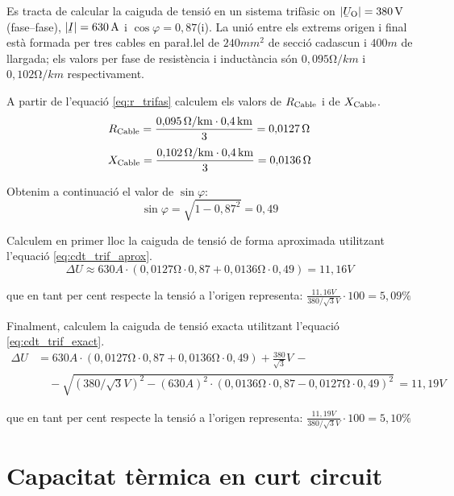 \vspace{2mm}
\begin{exemple}
   Es tracta de calcular la caiguda de tensi\'{o} en un sistema trif\`{a}sic on $|\cmplx{U}\ped{O}| = 380\unit{V}$ (fase--fase), $|\cmplx{I}|=630\unit{A}$ i $\cos \varphi = 0{,}87$(i). La uni\'{o} entre els extrems origen  i final est\`{a} formada per tres cables en para{\l.l}el de $240\unit{mm^2}$ de secci\'{o} cadascun i $400\unit{m}$ de llargada; els valors per fase de resist\`{e}ncia i induct\`{a}ncia s\'{o}n $0{,}095\unit{\ohm/km}$ i $0{,}102\unit{\ohm/km}$ respectivament.

A partir de l'equaci\'{o} \eqref{eq:r_trifas} calculem els valors de $R_\mathrm{Cable}$ i de $X_\mathrm{Cable}$.
\[
   R_\mathrm{Cable} = \frac{0{,}095\mathrm{\,\mathrm{\Omega}/km}\cdot 0{,}4\mathrm{\,km}}{3} = 0{,}0127\mathrm{\,\mathrm{\Omega}}
\]
\[
   X_\mathrm{Cable} = \frac{0{,}102\mathrm{\,\mathrm{\Omega}/km}\cdot 0{,}4\mathrm{\,km}}{3} = 0{,}0136\mathrm{\,\mathrm{\Omega}}
\]

Obtenim a continuaci\'{o} el valor de $\sin \varphi$:
\[
   \sin \varphi = \sqrt{1-0{,}87^2} = 0,49
\]

Calculem en primer lloc la caiguda de tensi\'{o} de forma aproximada utilitzant l'equaci\'{o} \eqref{eq:cdt_trif_aprox}.
\[
   \Delta U \approx 630\unit{A} \cdot ( 0{,}0127\unit{\ohm} \cdot 0{,}87 + 0{,}0136\unit{\ohm} \cdot 0{,}49 ) = 11{,}16\unit{V}
\]

que en tant per cent respecte la tensi\'{o} a l'origen representa:
$\frac{11{,}16\unit{V}}{380/\sqrt{3}\unit{V}} \cdot 100 = 5{,}09\unit{\%} $

Finalment, calculem la caiguda de tensi\'{o} exacta utilitzant l'equaci\'{o} \eqref{eq:cdt_trif_exact}.
\[ \begin{split}
   \Delta U &=  630\unit{A} \cdot ( 0{,}0127\unit{\ohm} \cdot 0{,}87 + 0{,}0136\unit{\ohm} \cdot 0{,}49 ) + \frac{380}{\sqrt{3}}\unit{V} \,- \\
    & \quad - \sqrt{(380/\sqrt{3}\unit{V})^2 - (630\unit{A})^2 \cdot ( 0{,}0136\unit{\ohm} \cdot 0{,}87 - 0{,}0127\unit{\ohm} \cdot 0{,}49 )^2 } \,= 11{,}19\unit{V}
\end{split} \]

que en tant per cent respecte la tensi\'{o} a l'origen representa:
$\frac{11{,}19\unit{V}}{380/\sqrt{3}\unit{V}} \cdot 100 = 5{,}10\unit{\%} $
\end{exemple}

\section{Capacitat t\`{e}rmica en curt circuit}

